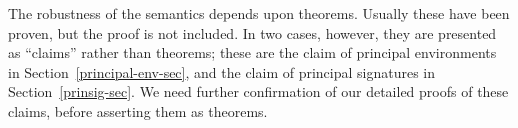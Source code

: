 The robustness of the semantics depends upon theorems.  
Usually these have been proven, but the proof is not included.
In two cases, however, they are presented as ``claims'' rather than
theorems; these are the claim of principal environments in 
Section~\ref{principal-env-sec}, and the claim of principal signatures
in Section~\ref{prinsig-sec}.  We need further confirmation of our
detailed proofs of these claims, before asserting them as theorems.




